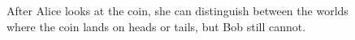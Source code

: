 \begin{example}
\begin{figure}
\begin{center} 
\caption{\label{semantics-coin-s5-2}
After Alice looks at the coin, she can distinguish between the worlds where the
coin lands on heads or tails, but Bob still cannot.
}
\end{center}
\end{figure}
\end{example}

